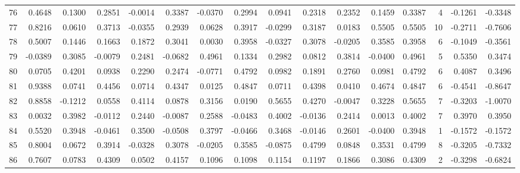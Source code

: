 \begin{tabular}{lrrrrrrrrrrrrrrr}
76  &      0.4648 &  0.1300 &  0.2851 & -0.0014 &  0.3387 & -0.0370 &  0.2994 &  0.0941 &  0.2318 &  0.2352 &   0.1459 &     0.3387 &      4 &                   -0.1261 &                    -0.3348 \\
77  &      0.8216 &  0.0610 &  0.3713 & -0.0355 &  0.2939 &  0.0628 &  0.3917 & -0.0299 &  0.3187 &  0.0183 &   0.5505 &     0.5505 &     10 &                   -0.2711 &                    -0.7606 \\
78  &      0.5007 &  0.1446 &  0.1663 &  0.1872 &  0.3041 &  0.0030 &  0.3958 & -0.0327 &  0.3078 & -0.0205 &   0.3585 &     0.3958 &      6 &                   -0.1049 &                    -0.3561 \\
79  &     -0.0389 &  0.3085 & -0.0079 &  0.2481 & -0.0682 &  0.4961 &  0.1334 &  0.2982 &  0.0812 &  0.3814 &  -0.0400 &     0.4961 &      5 &                    0.5350 &                     0.3474 \\
80  &      0.0705 &  0.4201 &  0.0938 &  0.2290 &  0.2474 & -0.0771 &  0.4792 &  0.0982 &  0.1891 &  0.2760 &   0.0981 &     0.4792 &      6 &                    0.4087 &                     0.3496 \\
81  &      0.9388 &  0.0741 &  0.4456 &  0.0714 &  0.4347 &  0.0125 &  0.4847 &  0.0711 &  0.4398 &  0.0410 &   0.4674 &     0.4847 &      6 &                   -0.4541 &                    -0.8647 \\
82  &      0.8858 & -0.1212 &  0.0558 &  0.4114 &  0.0878 &  0.3156 &  0.0190 &  0.5655 &  0.4270 & -0.0047 &   0.3228 &     0.5655 &      7 &                   -0.3203 &                    -1.0070 \\
83  &      0.0032 &  0.3982 & -0.0112 &  0.2440 & -0.0087 &  0.2588 & -0.0483 &  0.4002 & -0.0136 &  0.2414 &   0.0013 &     0.4002 &      7 &                    0.3970 &                     0.3950 \\
84  &      0.5520 &  0.3948 & -0.0461 &  0.3500 & -0.0508 &  0.3797 & -0.0466 &  0.3468 & -0.0146 &  0.2601 &  -0.0400 &     0.3948 &      1 &                   -0.1572 &                    -0.1572 \\
85  &      0.8004 &  0.0672 &  0.3914 & -0.0328 &  0.3078 & -0.0205 &  0.3585 & -0.0875 &  0.4799 &  0.0848 &   0.3531 &     0.4799 &      8 &                   -0.3205 &                    -0.7332 \\
86  &      0.7607 &  0.0783 &  0.4309 &  0.0502 &  0.4157 &  0.1096 &  0.1098 &  0.1154 &  0.1197 &  0.1866 &   0.3086 &     0.4309 &      2 &                   -0.3298 &                    -0.6824 \\

\end{tabular}
